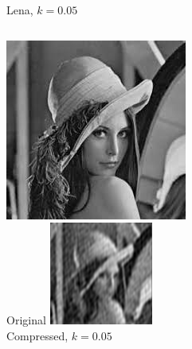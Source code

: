\documentclass[12pt]{beamer}
\begin{document}
\begin{frame}{Lena, \(k=0.05\)}
  \begin{columns}
      \includegraphics[width=\textwidth]{Lena.jpeg}\\
      \footnotesize Original
      \includegraphics[width=\textwidth]{Lena_k05.png}\\
      \footnotesize Compressed, \(k=0.05\)
  \end{columns}
\end{frame}
\end{document}

